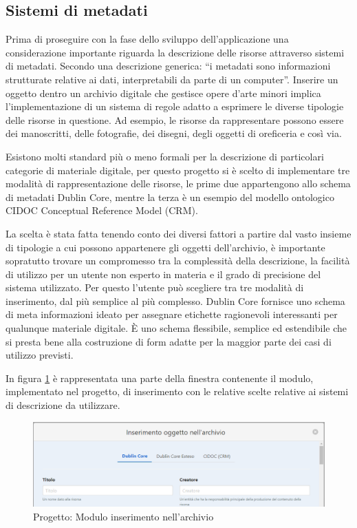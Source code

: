\subsection{Sistemi di metadati}

Prima di proseguire con la fase dello sviluppo dell'applicazione una considerazione importante riguarda la descrizione delle risorse attraverso sistemi di metadati. Secondo una descrizione generica: “i metadati sono informazioni strutturate relative ai dati, interpretabili da parte di un computer”. Inserire un oggetto dentro un archivio digitale che gestisce opere d’arte minori implica l'implementazione di un sistema di regole adatto a esprimere le diverse tipologie delle risorse in questione. Ad esempio, le risorse da rappresentare possono essere dei manoscritti, delle fotografie, dei disegni, degli oggetti di oreficeria e così via.

Esistono molti standard più o meno formali per la descrizione di particolari categorie di materiale digitale, per questo progetto si è scelto di implementare tre modalità di rappresentazione delle risorse, le prime due appartengono allo schema di metadati Dublin Core, mentre la terza è un esempio del modello ontologico CIDOC Conceptual Reference Model (CRM).

La scelta è stata fatta tenendo conto dei diversi fattori a partire dal vasto insieme di tipologie a cui possono appartenere gli oggetti dell'archivio, è importante sopratutto trovare un compromesso tra la complessità della descrizione, la facilità di utilizzo per un utente non esperto in materia e il grado di precisione del sistema utilizzato. Per questo l’utente può scegliere tra tre modalità di inserimento, dal più semplice al più complesso. Dublin Core fornisce uno schema di meta informazioni ideato per assegnare etichette ragionevoli interessanti per qualunque materiale digitale. È uno schema flessibile, semplice ed estendibile che si presta bene alla costruzione di form adatte per la maggior parte dei casi di utilizzo previsti.

In figura \ref{fig:progettoInserimento} è rappresentata una parte della finestra contenente il modulo, implementato nel progetto, di inserimento con le relative scelte relative ai sistemi di descrizione da utilizzare.

\begin{figure}[H]
\centering
\includegraphics[width=1\textwidth]{immagini/inserimentoArchivio.PNG}
\caption{Progetto: Modulo inserimento nell'archivio}
\label{fig:progettoInserimento}
\end{figure}

